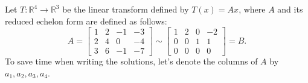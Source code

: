 \documentclass[addpoints]{exam}
\newcommand{\row}{\mathrm{row}}
\begin{document}
\begin{questions}

    \newpage

    \question 
    Let $T:\mathbb{R}^4 \to \mathbb{R}^3$ be the linear transform defined by
    $T(x)=Ax$, where $A$ and its reduced echelon form are defined as follows:
    \[
        A=
        \begin{bmatrix}
            1 & 2 & -1 & -3 \\
            2 & 4 & 0 & -4 \\
            3 & 6 & -1 & -7
        \end{bmatrix}
        \sim
        \begin{bmatrix}
            1 & 2 & 0 & -2 \\
            0 & 0 & 1 & 1 \\
            0 & 0 & 0 & 0
        \end{bmatrix}
        = B.
    \]
    To save time when writing the solutions, let's denote the columns of $A$ by
    $a_1,a_2,a_3,a_4$.

    \newpage


\end{questions}
\end{document}
